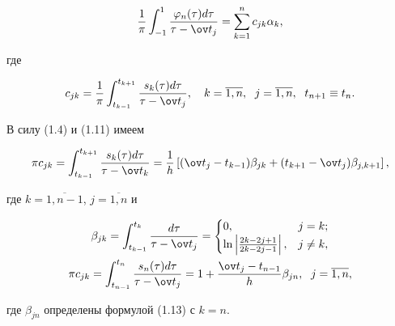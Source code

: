 \begin{equation}


\frac{1}{\pi}\int_{-1}^{1}\frac{\varphi_n(\tau)d\tau}{\tau-\ov t_j}=


\sum_{k=1}^{n}c_{jk}\alpha_k,


\end{equation}


где


\begin{equation}


c_{jk}=\frac{1}{\pi}\int_{t_{k-1}}^{t_{k+1}}\frac{s_k(\tau)d\tau}{\tau-


\ov t_j},\quad k=\overline{1,n},\ \;


j=\overline{1,n},\ \; t_{n+1}\equiv t_n.


\end{equation}


В силу (1.4) и (1.11) имеем


\begin{equation}


\pi c_{jk}=\int_{t_{k-1}}^{t_{k+1}}\frac{s_k(\tau)d\tau}{\tau-\ov t_k}=


\frac{1}{h}\left[(\ov t_j-t_{k-1})\beta_{jk}+(t_{k+1}-\ov t_j)\beta_


{j,k+1}\right],


\end{equation}


где $k=\overline{1,n-1}$, $j=\overline{1,n}$ и


\begin{gather}


\beta_{jk}=\int_{t_{k-1}}^{t_k}\frac{d\tau}{\tau-\ov t_j}=


\begin{cases}


0, & j=k;\\


\ln\left|\frac{2k-2j+1}{2k-2j-1}\right|, & j\ne k,


\end{cases} \\


%


\pi c_{jk}=\int_{t_{n-1}}^{t_n}\frac{s_n(\tau)d\tau}{\tau-\ov t_j}=


1+\frac{\ov t_j-t_{n-1}}{h}\beta_{jn},\ \; j=\overline{1,n},


\end{gather}


где $\beta_{j n}$ определены формулой (1.13) с $k=n$.





